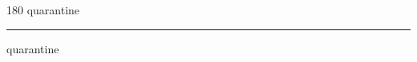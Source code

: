 
\begin{frame}
\begin{center}
\begin{turn}{180}
{\fontsize{2.5cm}{1em}\selectfont quarantine}
\end{turn}
\vspace{1em}\par  
\hrule
\vspace{1em}\par  
{\fontsize{2.5cm}{1em}\selectfont quarantine}
\end{center}
\end{frame}
